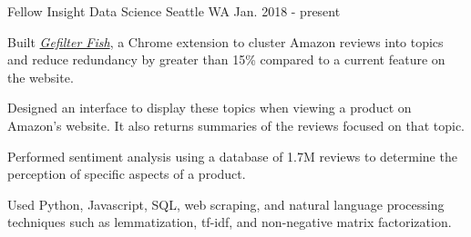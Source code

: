 


\begin{cventries}


\cventry
{Fellow} %
{Insight Data Science} %
{Seattle WA} %
{Jan. 2018 - present} %
{ %
\begin{cvitems}
 \vspace{0.1cm}
\item {Built \href{https://gefilterfish.science}{\textit{Gefilter Fish}}, a Chrome extension to cluster Amazon reviews into topics and reduce redundancy by greater than 15\% compared to a current feature on the website.\vspace{0.1cm}}
\item{Designed an interface to display these topics when viewing a product on Amazon's website. It also returns summaries of the reviews focused on that topic.\vspace{0.1cm}}
\item{Performed sentiment analysis using a database of 1.7M reviews to determine the perception of specific aspects of a product.\vspace{0.1cm}}
\item{Used Python, Javascript, SQL, web scraping, and natural language processing techniques such as lemmatization, tf-idf, and non-negative matrix factorization.}
\end{cvitems}
}



\end{cventries}
